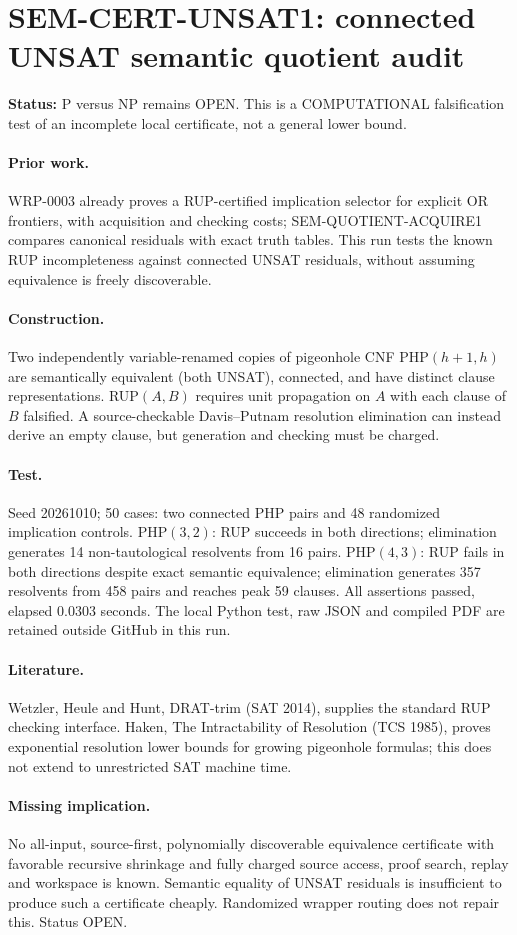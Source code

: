 \documentclass{article}
\begin{document}
\section*{SEM-CERT-UNSAT1: connected UNSAT semantic quotient audit}
\textbf{Status:} P versus NP remains OPEN. This is a COMPUTATIONAL falsification test of an incomplete local certificate, not a general lower bound.
\paragraph{Prior work.} WRP-0003 already proves a RUP-certified implication selector for explicit OR frontiers, with acquisition and checking costs; SEM-QUOTIENT-ACQUIRE1 compares canonical residuals with exact truth tables. This run tests the known RUP incompleteness against connected UNSAT residuals, without assuming equivalence is freely discoverable.
\paragraph{Construction.} Two independently variable-renamed copies of pigeonhole CNF PHP$(h+1,h)$ are semantically equivalent (both UNSAT), connected, and have distinct clause representations. RUP$(A,B)$ requires unit propagation on $A$ with each clause of $B$ falsified. A source-checkable Davis--Putnam resolution elimination can instead derive an empty clause, but generation and checking must be charged.
\paragraph{Test.} Seed 20261010; 50 cases: two connected PHP pairs and 48 randomized implication controls. PHP$(3,2)$: RUP succeeds in both directions; elimination generates 14 non-tautological resolvents from 16 pairs. PHP$(4,3)$: RUP fails in both directions despite exact semantic equivalence; elimination generates 357 resolvents from 458 pairs and reaches peak 59 clauses. All assertions passed, elapsed 0.0303 seconds. The local Python test, raw JSON and compiled PDF are retained outside GitHub in this run.
\paragraph{Literature.} Wetzler, Heule and Hunt, DRAT-trim (SAT 2014), supplies the standard RUP checking interface. Haken, The Intractability of Resolution (TCS 1985), proves exponential resolution lower bounds for growing pigeonhole formulas; this does not extend to unrestricted SAT machine time.
\paragraph{Missing implication.} No all-input, source-first, polynomially discoverable equivalence certificate with favorable recursive shrinkage and fully charged source access, proof search, replay and workspace is known. Semantic equality of UNSAT residuals is insufficient to produce such a certificate cheaply. Randomized wrapper routing does not repair this. Status OPEN.
\end{document}
